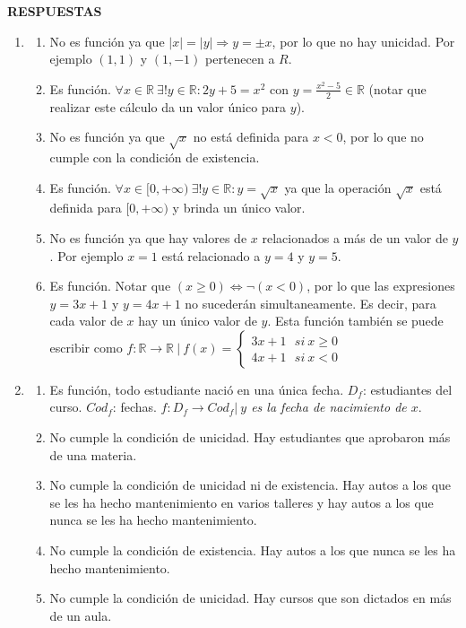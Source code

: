 \documentclass[a4paper]{article}
\newcommand{\exercise}{\item}
\newcommand{\Then}{\Rightarrow}
\newcommand{\Eq}{\Leftrightarrow}
\begin{document}
 \textbf{RESPUESTAS}\begin{enumerate}\exercise\begin{enumerate} [label=(\alph*)]		\item No es función ya que $|x|=|y| \Then y=\pm x$, por lo que no hay unicidad. Por ejemplo $(1,1)$ y $(1,-1)$ pertenecen a $R$.
		\item Es función. $\forall x\in\mathbb{R} ~\exists ! y \in \mathbb{R}: 2y+5=x^2$ con $y=\frac{x^2-5}{2}\in\mathbb{R}$ (notar que realizar este cálculo da un valor único para $y$). 
		\item No es función ya que $\sqrt{x}$ no está definida para $x<0$, por lo que no cumple con la condición de existencia.
		\item Es función. $\forall x\in [0,+\infty) ~\exists ! y \in \mathbb{R}: y=\sqrt{x}$ ya que la operación $\sqrt{x}$ está definida para $[0,+\infty)$ y brinda un único valor.
		\item No es función ya que hay valores de $x$ relacionados a más de un valor de $y$. Por ejemplo $x=1$ está relacionado a $y=4$ y $y=5$.
		\item Es función. Notar que $(x\geq0) \Eq \neg(x<0)$, por lo que las expresiones $y=3x+1$ y $y=4x+1$ no sucederán simultaneamente. Es decir, para cada valor de $x$ hay un único valor de $y$. Esta función también se puede escribir como $f: \mathbb{R} \to \mathbb{R} ~|~ f(x)=\left\{\begin{matrix}3x+1 ~~~si~ x\geq0\\ 4x+1 ~~~si~ x<0\end{matrix}\right.$
\end{enumerate}\exercise\begin{enumerate} [label=(\alph*)]		\item Es función, todo estudiante nació en una única fecha. $D_f$: estudiantes del curso. $Cod_f$: fechas. $f:D_f \to Cod_f|~$\textit{$y$ es la fecha de nacimiento de $x$}.
		\item No cumple la condición de unicidad. Hay estudiantes que aprobaron más de una materia.
		\item No cumple la condición de unicidad ni de existencia. Hay autos a los que se les ha hecho mantenimiento en varios talleres y hay autos a los que nunca se les ha hecho mantenimiento.
		\item No cumple la condición de existencia. Hay autos a los que nunca se les ha hecho mantenimiento.
		\item No cumple la condición de unicidad. Hay cursos que son dictados en más de un aula.

\end{enumerate}
\end{enumerate}
\end{document}
